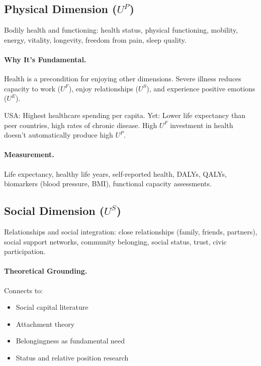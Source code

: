 \subsection{Physical Dimension ($U^P$)}
\label{sec:fepsde-physical}

\begin{definition}
Bodily health and functioning: health status, physical functioning, mobility,
energy, vitality, longevity, freedom from pain, sleep quality.
\end{definition}

\paragraph{Why It's Fundamental.}
Health is a precondition for enjoying other dimensions.
Severe illness reduces capacity to work ($U^F$), enjoy relationships ($U^S$),
and experience positive emotions ($U^E$).

\begin{intuition}
USA: Highest healthcare spending per capita.
Yet: Lower life expectancy than peer countries, high rates of chronic disease.
High $U^F$ investment in health doesn't automatically produce high $U^P$.
\end{intuition}

\paragraph{Measurement.}
Life expectancy, healthy life years, self-reported health, DALYs, QALYs,
biomarkers (blood pressure, BMI), functional capacity assessments.

\subsection{Social Dimension ($U^S$)}
\label{sec:fepsde-social}

\begin{definition}
Relationships and social integration: close relationships (family, friends, partners),
social support networks, community belonging, social status, trust, civic participation.
\end{definition}

\paragraph{Theoretical Grounding.}
Connects to:
\begin{itemize}[nosep]
  \item Social capital literature \citep{putnam2000}
  \item Attachment theory
  \item Belongingness as fundamental need
  \item Status and relative position research
\end{itemize}

